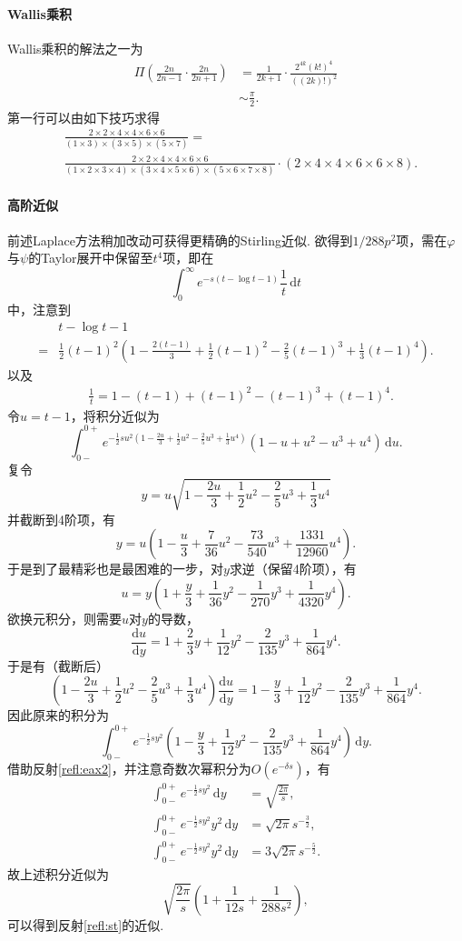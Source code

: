 \documentclass[UTF-8]{ctexart}
\newcommand{\dr}{\mathrm{d}}
\newcommand{\dd}{\mathrm{d}}
\newcommand{\de}[2]{\frac{\dd #1}{\dd #2}}
\newcommand{\pare}[1]{\left(#1\right)}
\newcommand{\half}{\frac{1}{2}}
\newcommand{\intt}[2]{\int_0^\infty #1 \, \dr #2}
\newcommand{\intab}[4]{\int_{#1}^{#2} #3 \, \dr #4}
\newcommand{\rref}[1]{反射\ref{refl:#1}}
\begin{document}
  \paragraph{Wallis乘积}Wallis乘积的解法之一为
  \begin{align*}
    \Pi\pare{\frac{2n}{2n-1}\cdot\frac{2n}{2n+1}} &= \frac{1}{2k+1}\cdot\frac{2^{4k}\pare{k!}^4}{\pare{\pare{2k}!}^2} \\
    &\sim \frac{\pi}{2}.
  \end{align*}
  第一行可以由如下技巧求得
  \newcommand{\x}{\times}
  \begin{align*}
  &\frac{2\x2\x4\x4\x6\x6}{\pare{1\x3}\x\pare{3\x5}\x\pare{5\x7}} =\\ &\frac{2\x2\x4\x4\x6\x6}{\pare{1\x2\x3\x4}\x\pare{3\x4\x5\x6}\x\pare{5\x6\x7\x8}}\cdot\pare{2\x4\x4\x6\x6\x8}.
  \end{align*}
  \paragraph{高阶近似}前述Laplace方法稍加改动可获得更精确的Stirling近似. 欲得到$1/288p^2$项，需在$\varphi$与$\psi$的Taylor展开中保留至$t^4$项，即在
  \[ \intt{e^{-s\pare{t-\log t -1}}\frac{1}{t}}{t} \]
  中，注意到
  \begin{align*}
  & t-\log t-1\\
  =& \half \pare{t-1}^2\pare{1-\frac{2 \pare{t-1}}{3}+\frac{1}{2} \pare{t-1}^2-\frac{2}{5} \pare{t-1}^3+\frac{1}{3} \pare{t-1}^4}. 
  \end{align*}
  以及
  \begin{align*}
    &\frac{1}{t} = 1-\pare{t-1}+\pare{t-1}^2-\pare{t-1}^3+\pare{t-1}^4.
  \end{align*}
  令$u=t-1$，将积分近似为
  \[ \intab{0-}{0+}{e^{-\half su^2\pare{1-\frac{2 u}{3}+\frac{1}{2} u^2-\frac{2}{5} u^3+\frac{1}{3} u^4}}\pare{1-u+u^2-u^3+u^4}}{u}. \]
  复令
  \[ y=u\sqrt{1-\frac{2 u}{3}+\frac{1}{2} u^2-\frac{2}{5} u^3+\frac{1}{3} u^4} \]
  并截断到4阶项，有
  \[ y= u\pare{1-\frac{u}{3}+\frac{7}{36}u^2-\frac{73}{540}u^3+\frac{1331}{12960}u^4}. \]
  于是到了最精彩也是最困难的一步，对$y$求逆（保留4阶项），有
  \[ u=y\pare{1+\frac{y}{3}+\frac{1}{36}y^2-\frac{1}{270}y^3+\frac{1}{4320}y^4}. \]
  欲换元积分，则需要$u$对$y$的导数，
  \[ \de{u}{y} = 1+\frac{2}{3}y+\frac{1}{12}y^2-\frac{2}{135}y^3+\frac{1}{864}y^4. \]
  于是有（截断后）
  \[ \pare{1-\frac{2 u}{3}+\frac{1}{2} u^2-\frac{2}{5} u^3+\frac{1}{3} u^4} \de{u}{y} = 1-\frac{y}{3}+\frac{1}{12}y^2-\frac{2}{135}y^3+\frac{1}{864}y^4. \]
  因此原来的积分为
  \[ \intab{0-}{0+}{e^{-\half s y^2}\pare{1-\frac{y}{3}+\frac{1}{12}y^2-\frac{2}{135}y^3+\frac{1}{864}y^4}}{y}. \]
  借助\rref{eax2}，并注意奇数次幂积分为$O\pare{e^{-\delta s}}$，有
  \begin{align*}
  \intab{0-}{0+}{e^{-\half s y^2}}{y} &= \sqrt{\frac{2\pi}{s}}, \\
  \intab{0-}{0+}{e^{-\half s y^2}y^2}{y} &= \sqrt{2\pi}s^{-\frac{3}{2}}, \\
  \intab{0-}{0+}{e^{-\half s y^2}y^2}{y} &= 3\sqrt{2\pi}s^{-\frac{5}{2}}.
  \end{align*}
  故上述积分近似为
  \[ \sqrt{\frac{2\pi}{s}}\pare{1+\frac{1}{12s}+\frac{1}{288s^2}}, \]
  可以得到\rref{st}的近似.
\end{document}
